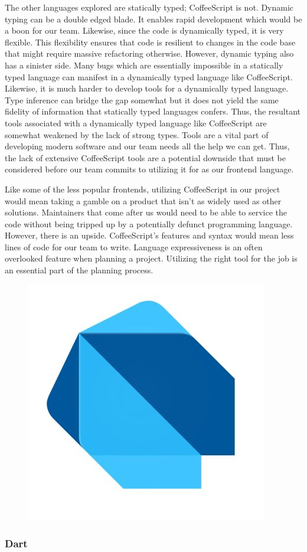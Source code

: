 \documentclass[12pt]{report}
\begin{document}
\begin{enumerate}
The other languages explored are statically typed; CoffeeScript is not. Dynamic typing can be a double edged blade. It enables rapid development which would be a boon for our team. Likewise, since the code is dynamically typed, it is very flexible. This flexibility ensures that code is resilient to changes in the code base that might require massive refactoring otherwise. However, dynamic typing also has a sinister side. Many bugs which are essentially impossible in a statically typed language can manifest in a dynamically typed language like CoffeeScript. Likewise, it is much harder to develop tools for a dynamically typed language. Type inference can bridge the gap somewhat but it does not yield the same fidelity of information that statically typed languages confers. Thus, the resultant tools associated with a dynamically typed language like CoffeeScript are somewhat weakened by the lack of strong types. Tools are a vital part of developing modern software and our team needs all the help we can get. Thus, the lack of extensive CoffeeScript tools are a potential downside that must be considered before our team commits to utilizing it for as our frontend language.

Like some of the less popular frontends, utilizing CoffeeScript in our project would mean taking a gamble on a product that isn't as widely used as other solutions. Maintainers that come after us would need to be able to service the code without being tripped up by a potentially defunct programming language. However, there is an upside. CoffeeScript's features and syntax would mean less lines of code for our team to write. Language expressiveness is an often overlooked feature when planning a project. Utilizing the right tool for the job is an essential part of the planning process.

\begin{figure}[h]
	\centering
	\includegraphics[width=0.25\linewidth]{dart}
\end{figure}

\subsubsection*{Dart}


\end{enumerate}
\end{document}
